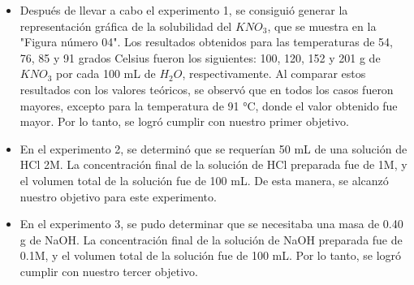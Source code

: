 \documentclass[../main.tex]{subfiles}
\begin{document}
\begin{itemize}
    \item 
    Después de llevar a cabo el experimento 1, se consiguió generar la representación gráfica 
    de la solubilidad del $KNO_3$, que se muestra en la "Figura número 04". 
    Los resultados obtenidos para las temperaturas de 54, 76, 85 y 91 
    grados Celsius fueron los siguientes: 100, 120, 152 y 201 g de $KNO_3$ 
    por cada 100 mL de $H_2O$, respectivamente. Al comparar estos resultados con los 
    valores teóricos, se observó que en todos los casos fueron mayores, 
    excepto para la temperatura de 91 °C, donde el valor obtenido fue mayor. 
    Por lo tanto, se logró cumplir con nuestro primer objetivo.
    \item En el experimento 2, se determinó que se requerían 50 mL de una solución de HCl 2M. 
    La concentración final de la solución de HCl preparada fue de 1M, 
    y el volumen total de la solución fue de 100 mL. De esta manera, se alcanzó nuestro objetivo para este experimento.
    \item En el experimento 3, se pudo determinar que se necesitaba una masa de 0.40 g de NaOH. 
    La concentración final de la solución de NaOH preparada fue de 0.1M, 
    y el volumen total de la solución fue de 100 mL. 
    Por lo tanto, se logró cumplir con nuestro tercer objetivo.
\end{itemize}
\end{document}
